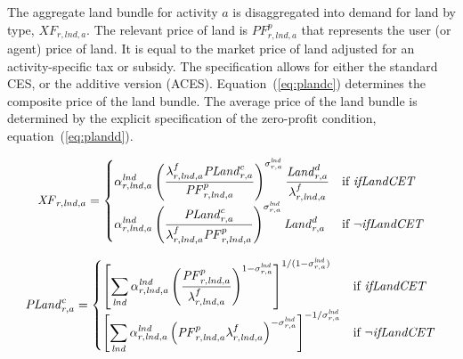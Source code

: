 \documentclass[11pt,letterpaper]{report}
\begin{document}
The aggregate land bundle for activity $a$ is disaggregated into demand for
land by type, $\mathit{XF}_{\mathit{r,lnd,a}}$.
The relevant price of land is $\mathit{PF}^p_{\mathit{r,lnd,a}}$ that represents the
user (or agent) price of land. It is equal to the market price of land adjusted
for an activity-specific tax or subsidy. The specification
allows for either the standard CES, or the additive version (ACES).
Equation~(\ref{eq:plandc}) determines the composite price of the land bundle.
The average price of the land bundle is determined by the
explicit specification of the zero-profit condition, equation~(\ref{eq:plandd}).

\begin{equation}
\label{eq:lnd}
\mathit{XF}_{r,\mathit{lnd},a} =
\begin{cases}
   \displaystyle {
         \alpha^{\mathit{lnd}}_{r,\mathit{lnd},a}
         \left( \frac {\lambda^f_{r,\mathit{lnd},a} \mathit{PLand}^c_{r,a}}
            {\mathit{PF}^p_{r,\mathit{lnd},a}}
         \right)^{\sigma^{\mathit{lnd}}_{r,a}}
         \frac {\mathit{Land}^d_{r,a}} {\lambda^f_{r,\mathit{lnd},a}}
      }
   & \textnormal{if } \mathit{ifLandCET} \\
   \displaystyle {
         \alpha^{\mathit{lnd}}_{r,\mathit{lnd},a}
         \left( \frac {\mathit{PLand}^c_{r,a}}
            {\lambda^f_{r,\mathit{lnd},a} \mathit{PF}^p_{r,\mathit{lnd},a}} \right)^{\sigma^{\mathit{lnd}}_{r,a}}
         {\mathit{Land}^d_{r,a}}
      }
   & \textnormal{if } \neg \mathit{ifLandCET} \\
\end{cases}
\end{equation}

\begin{equation}
\label{eq:plandc}
\mathit{PLand}^c_{r,a} =
\begin{cases}
   \displaystyle {
   		\left[ \sum_{\mathit{lnd}}{\alpha^{\mathit{lnd}}_{r,\mathit{lnd},a}
   		\left( \frac{\mathit{PF}^p_{r,\mathit{lnd},a}}{\lambda^f_{r,\mathit{lnd},a}}
   		\right)^{1-\sigma^{\mathit{lnd}}_{r,a}}}\right]^{1/(1-\sigma^{\mathit{lnd}}_{r,a})}
      }
   & \textnormal{if } \mathit{ifLandCET} \\
   \displaystyle {
   		\left[ \sum_{\mathit{lnd}}{\alpha^{\mathit{lnd}}_{r,\mathit{lnd},a}
   		\left( {\mathit{PF}^p_{r,\mathit{lnd},a}}{\lambda^f_{r,\mathit{lnd},a}}
   		\right)^{-\sigma^{\mathit{lnd}}_{r,a}}}\right]^{-1/\sigma^{\mathit{lnd}}_{r,a}}
      }
   & \textnormal{if } \neg \mathit{ifLandCET} \\
\end{cases}
\end{equation}
\end{document}
